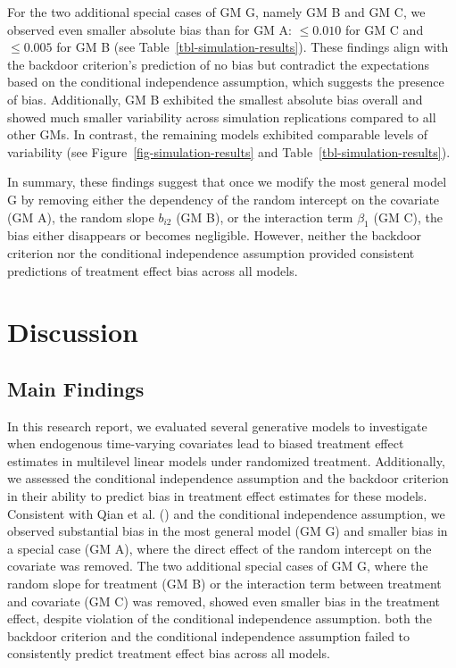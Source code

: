 \documentclass[
  11pt,
  a4paper,
]{article}
\begin{document}
For the two additional special cases of GM G, namely GM B and GM C, we
observed even smaller absolute bias than for GM A: \(\leq 0.010\) for GM
C and \(\leq 0.005\) for GM B (see Table~\ref{tbl-simulation-results}).
These findings align with the backdoor criterion's prediction of no bias
but contradict the expectations based on the conditional independence
assumption, which suggests the presence of bias. Additionally, GM B
exhibited the smallest absolute bias overall and showed much smaller
variability across simulation replications compared to all other GMs. In
contrast, the remaining models exhibited comparable levels of
variability (see Figure~\ref{fig-simulation-results} and
Table~\ref{tbl-simulation-results}).

In summary, these findings suggest that once we modify the most general
model G by removing either the dependency of the random intercept on the
covariate (GM A), the random slope \(b_{i2}\) (GM B), or the interaction
term \(\beta_1\) (GM C), the bias either disappears or becomes
negligible. However, neither the backdoor criterion nor the conditional
independence assumption provided consistent predictions of treatment
effect bias across all models.

\section{Discussion}\label{discussion}

\subsection{Main Findings}\label{main-findings}

In this research report, we evaluated several generative models to
investigate when endogenous time-varying covariates lead to biased
treatment effect estimates in multilevel linear models under randomized
treatment. Additionally, we assessed the conditional independence
assumption and the backdoor criterion in their ability to predict bias
in treatment effect estimates for these models. Consistent with Qian et
al. () and the conditional independence
assumption, we observed substantial bias in the most general model (GM
G) and smaller bias in a special case (GM A), where the direct effect of
the random intercept on the covariate was removed. The two additional
special cases of GM G, where the random slope for treatment (GM B) or
the interaction term between treatment and covariate (GM C) was removed,
showed even smaller bias in the treatment effect, despite violation of
the conditional independence assumption. both the backdoor criterion and
the conditional independence assumption failed to consistently predict
treatment effect bias across all models.
\end{document}
